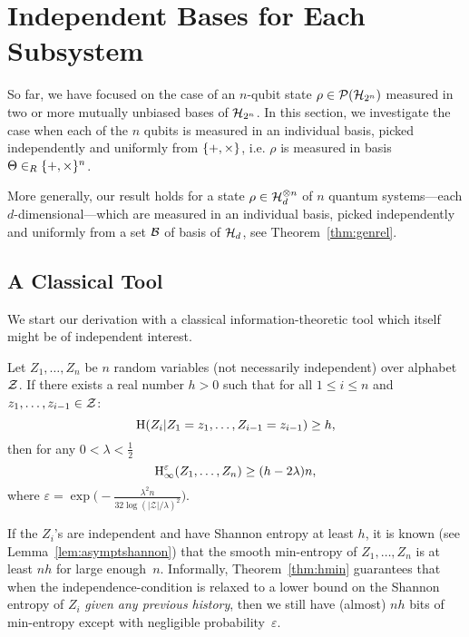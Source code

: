 \section{Independent Bases for Each Subsystem} \label{sec:morerelation}
So far, we have focused on the case of an $n$-qubit state $\rho \in
\mathcal{P}(\mathcal{H}_{2^n})$ measured in two or more mutually unbiased bases of
$\mathcal{H}_{2^n}$. In this section, we investigate the case when each of
the $n$ qubits is measured in an individual basis, picked
independently and uniformly from $\{+,\times\}$, i.e. $\rho$ is
measured in basis \mbox{$\Theta \in_R \{+,\times\}^n$}.

More generally, our result holds for a state $\rho \in \mathcal{H}_d^{\otimes
  n}$ of $n$ quantum systems---each $d$-dimensional---which are
measured in an individual basis, picked independently and uniformly
from a set $\mathcal{B}$ of basis of $\mathcal{H}_d$, see Theorem~\ref{thm:genrel}.

\subsection{A Classical Tool}
We start our derivation with a classical information-theoretic tool
which itself might be of independent interest.
\begin{theorem}\label{thm:hmin}
Let $Z_1,\ldots, Z_n$ be $n$ random variables (not necessarily
independent) over alphabet $\mathcal{Z}$. If there exists a real number
$h>0$ such that for all $1\leq i\leq n$ and $z_1,\ldots, z_{i-1} \in \mathcal{Z}$:
\begin{equation*} %
\H(Z_i | Z_1=z_1,\ldots,Z_{i-1}=z_{i-1})\geq h,
\end{equation*}
then for any $0<\lambda<\frac12$ 
\[
\operatorname{H}_{\infty}^{\varepsilon}(Z_1,\ldots,Z_n) \geq (h-2\lambda) n,
\]
where $\varepsilon =
\exp{\bigl(-\frac{\lambda^2 n}{32\log(|\mathcal{Z}|/\lambda)^2}\bigr)}$.
\end{theorem}
If the $Z_i$'s are independent and have Shannon
entropy at least $h$,
it is known (see Lemma~\ref{lem:asymptshannon}) that the smooth min-entropy of
$Z_1,\ldots,Z_n$ is at least $n h$ for large enough~$n$. Informally,
Theorem~\ref{thm:hmin} guarantees that when the independence-condition
is relaxed to a lower bound on the Shannon entropy of $Z_i$ \emph{given
  any previous history}, then we still have (almost) $n h$ bits of
min-entropy except with negligible probability~$\varepsilon$. 

